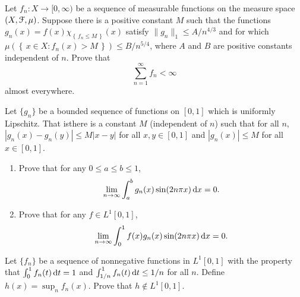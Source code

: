 \begin{problem}
  Let $f_n\colon X\to[0,\infty)$ be a sequence of measurable functions on
  the measure space $(X,\mathcal{F},\mu)$. Suppose there is a positive constant
  $M$ such that the functions $g_n(x)=f(x)\chi_{\left\{\,f_n\leq
      M\,\right\}}(x)$ satisfy $\|g_n\|_1\leq A/n^{4/3}$ and for which
  $\mu\left(\left\{\,x\in X:f_n(x)>M\,\right\}\right)\leq B/n^{5/4}$, where
  $A$ and $B$ are positive constants independent of $n$. Prove that
  \[
    \sum_{n=1}^\infty f_n<\infty
  \]
  almost everywhere.
\end{problem}
\begin{solution}
\end{solution}

\begin{problem}
  Let $\{g_n\}$ be a bounded sequence of functions on $[0,1]$ which is
  uniformly Lipschitz. That isthere is a constant $M$ (independent of $n$)
  such that for all $n$, $|g_n(x)-g_n(y)|\leq M|x-y|$ for all $x,y\in
  [0,1]$ and $|g_n(x)|\leq M$ for all $x\in[0,1]$.
  \begin{enumerate}[label=(\roman*),noitemsep]
  \item Prove that for any $0\leq a\leq b\leq 1$,
    \[
      \lim_{n\to\infty}\int_a^b g_n(x)\sin(2n\pi x)\mathop{}\!\mathrm{d} x=0.
    \]
  \item Prove that for any $f\in L^1[0,1]$,
    \[
      \lim_{n\to\infty}\int_0^1 f(x)g_n(x)\sin(2n\pi x)\mathop{}\!\mathrm{d} x=0.
    \]
  \end{enumerate}
\end{problem}
\begin{solution}
\end{solution}

\begin{problem}
  Let $\{f_n\}$ be a sequence of nonnegative functions in $L^1[0,1]$ with
  the property that $\int_0^1 f_n(t)\mathop{}\!\mathrm{d} t=1$ and $\int_{1/n}^1
  f_n(t)\mathop{}\!\mathrm{d} t\leq 1/n$ for all $n$. Define $h(x)=\sup_n f_n(x)$. Prove
  that $h\notin L^1[0,1]$.
\end{problem}
\begin{solution}
\end{solution}

